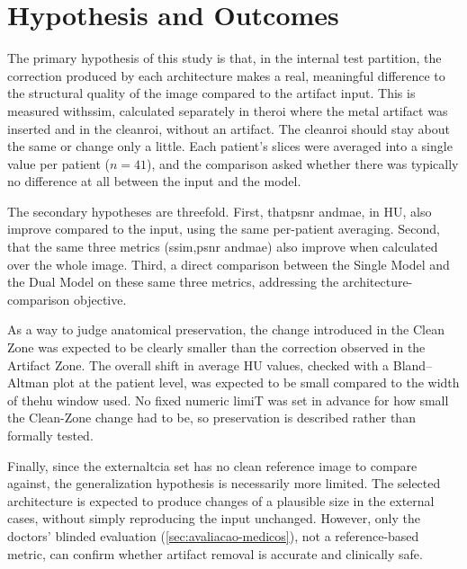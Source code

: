 \section{Hypothesis and Outcomes}

The primary hypothesis of this study is that, in the internal test partition, the correction produced by each architecture makes a real, meaningful difference to the structural quality of the image compared to the artifact input. This is measured with\acrshort{ssim}, calculated separately in the\acrfull{roi} where the metal artifact was inserted and in the clean\acrshort{roi}, without an artifact. The clean\acrshort{roi} should stay about the same or change only a little. Each patient's slices were averaged into a single value per patient ($n=41$), and the comparison asked whether there was typically no difference at all between the input and the model.

The secondary hypotheses are threefold. First, that\acrshort{psnr} and\acrshort{mae}, in HU, also improve compared to the input, using the same per-patient averaging. Second, that the same three metrics (\acrshort{ssim},\acrshort{psnr} and\acrshort{mae}) also improve when calculated over the whole image. Third, a direct comparison between the Single Model and the Dual Model on these same three metrics, addressing the architecture-comparison objective.

As a way to judge anatomical preservation, the change introduced in the Clean Zone was expected to be clearly smaller than the correction observed in the Artifact Zone. The overall shift in average HU values, checked with a Bland--Altman plot at the patient level, was expected to be small compared to the width of the\acrshort{hu} window used. No fixed numeric limiT was set in advance for how small the Clean-Zone change had to be, so preservation is described rather than formally tested.

Finally, since the external\acrshort{tcia} set has no clean reference image to compare against, the generalization hypothesis is necessarily more limited. The selected architecture is expected to produce changes of a plausible size in the external cases, without simply reproducing the input unchanged. However, only the doctors' blinded evaluation (\autoref{sec:avaliacao-medicos}), not a reference-based metric, can confirm whether artifact removal is accurate and clinically safe.

